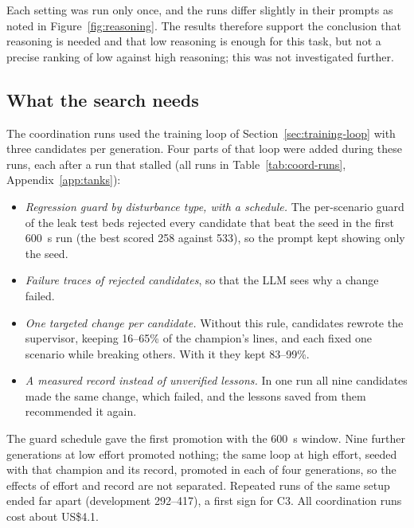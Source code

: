Each setting was run only once, and the runs differ slightly in their
prompts as noted in Figure~\ref{fig:reasoning}. The results therefore support
the conclusion that reasoning is needed and that low reasoning is enough for
this task, but not a precise ranking of low against high reasoning; this was
not investigated further.

\subsection{What the search needs}
\label{sec:tank-search}
The coordination runs used the training loop of
Section~\ref{sec:training-loop} with three candidates per generation. Four
parts of that loop were added during these runs, each after a run that
stalled (all runs in Table~\ref{tab:coord-runs}, Appendix~\ref{app:tanks}):
\begin{itemize}
\item \emph{Regression guard by disturbance type, with a schedule.} The
  per-scenario guard of the leak test beds rejected every candidate that beat
  the seed in the first 600~s run (the best scored 258 against 533), so the
  prompt kept showing only the seed.
\item \emph{Failure traces of rejected candidates}, so that the LLM sees why a
  change failed.
\item \emph{One targeted change per candidate.} Without this rule,
  candidates rewrote the supervisor, keeping 16--65\% of the champion's lines,
  and each fixed one scenario while breaking others. With it they kept
  83--99\%.
\item \emph{A measured record instead of unverified lessons.} In one run all
  nine candidates made the same change, which failed, and the lessons saved
  from them recommended it again.
\end{itemize}
The guard schedule gave the first promotion with the 600~s window. Nine
further generations at low effort promoted nothing; the same loop at high
effort, seeded with that champion and its record, promoted in each of four
generations, so the effects of effort and record are not separated. Repeated
runs of the same setup ended far apart (development 292--417), a first sign
for C3. All coordination runs cost about US\$4.1.

